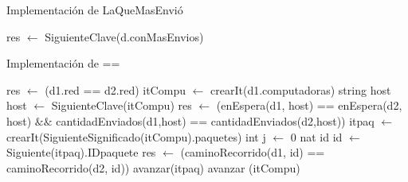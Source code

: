 \begin{Algoritmos}
\begin{algorithm}
\caption{Implementaci\'on de LaQueMasEnvi\'o}
\begin{algorithmic}[0]
	\State res $\gets$ SiguienteClave(d.conMasEnvios)	
\EndFunction {}
\end{algorithmic}
\end{algorithm}



\begin{algorithm}
\caption{Implementaci\'on de ==}
\begin{algorithmic}[0]
	\State res $\gets$ (d1.red == d2.red)						
	 													
		\State itCompu $\gets$ crearIt(d1.computadoras)  		
		\State string host 										
			
			\State host $\gets$ SiguienteClave(itCompu)			 
			\State res $\gets$ (enEspera(d1, host) == enEspera(d2, host) $\&\&$ \newline  cantidadEnviados(d1,host) == cantidadEnviados(d2,host))  
			\State itpaq $\gets$ crearIt(SiguienteSignificado(itCompu).paquetes) 
			\State int j $\gets$ 0												
			\State nat id														
				
				\State id $\gets$ Siguiente(itpaq).IDpaquete 					
				\State res $\gets$ (caminoRecorrido(d1, id) == caminoRecorrido(d2, id)) 
				\State avanzar(itpaq)											
			\EndWhile
		\State avanzar (itCompu)													
		\EndWhile
	\EndIf
\EndFunction {}
\end{algorithmic}
\end{algorithm}

\end{Algoritmos}

\clearpage


